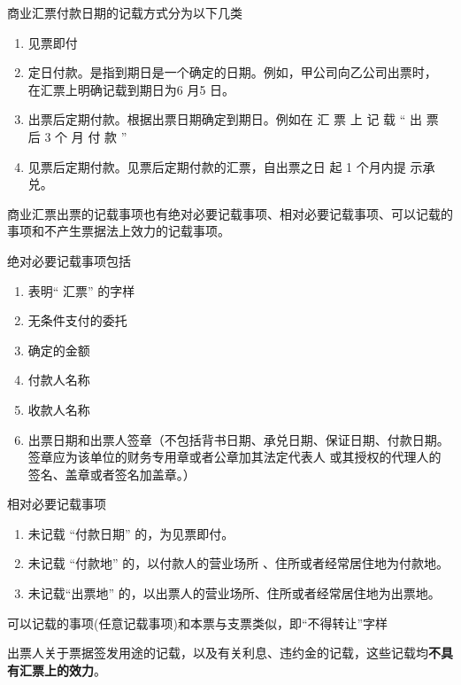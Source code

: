 \documentclass[UTF8,12pt]{ctexart}
\numberwithin{equation}{section} %
\numberwithin{figure}{section}
\numberwithin{table}{section}
\begin{document}
	商业汇票付款日期的记载方式分为以下几类
	\begin{enumerate}
		\item 见票即付
		
		\item 定日付款。是指到期日是一个确定的日期。例如，甲公司向乙公司出票时， 在汇票上明确记载到期日为6 月5 日。
		
		\item 出票后定期付款。根据出票日期确定到期日。例如在 汇 票 上 记 载 “ 出 票 后 3 个 月 付 款 ”
		
		\item 见票后定期付款。见票后定期付款的汇票，自出票之日 起 1 个月内提 示承兑。
	\end{enumerate}

	
	商业汇票出票的记载事项也有绝对必要记载事项、相对必要记载事项、可以记载的事项和不产生票据法上效力的记载事项。
	
	绝对必要记载事项包括
	\begin{enumerate}
		\item 表明“ 汇票” 的字样
		
		\item 无条件支付的委托
		
		\item 确定的金额
		
		\item 付款人名称
		
		\item 收款人名称
		
		\item 出票日期和出票人签章（不包括背书日期、承兑日期、保证日期、付款日期。签章应为该单位的财务专用章或者公章加其法定代表人 或其授权的代理人的签名、盖章或者签名加盖章。）
	\end{enumerate}


	相对必要记载事项
	\begin{enumerate}
		\item 未记载 “付款日期” 的，为见票即付。
		
		\item 未记载 “付款地” 的，以付款人的营业场所 、住所或者经常居住地为付款地。 
		
		\item 未记载“出票地” 的，以出票人的营业场所、住所或者经常居住地为出票地。
	\end{enumerate}

	
	可以记载的事项(任意记载事项)和本票与支票类似，即“不得转让”字样
	
	出票人关于票据签发用途的记载，以及有关利息、违约金的记载，这些记载均\textbf{不具有汇票上的效力}。
	
\end{document}

